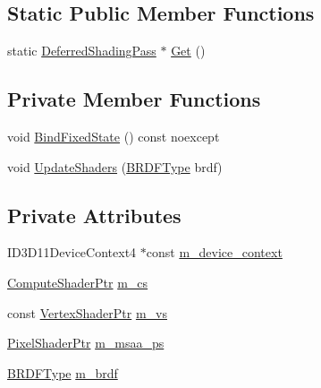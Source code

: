 \subsection*{Static Public Member Functions}
\begin{DoxyCompactItemize}
\item 
static \hyperlink{classmage_1_1_deferred_shading_pass}{Deferred\+Shading\+Pass} $\ast$ \hyperlink{classmage_1_1_deferred_shading_pass_a430dec186afda1f40c695b95fe3f7338}{Get} ()
\end{DoxyCompactItemize}
\subsection*{Private Member Functions}
\begin{DoxyCompactItemize}
\item 
void \hyperlink{classmage_1_1_deferred_shading_pass_a17b470e0d5ce381cd18d126d20649238}{Bind\+Fixed\+State} () const noexcept
\item 
void \hyperlink{classmage_1_1_deferred_shading_pass_a1be48c61dfb255a1641bae23d5277e4f}{Update\+Shaders} (\hyperlink{namespacemage_af1044f87544bc38427766a8c795d2f26}{B\+R\+D\+F\+Type} brdf)
\end{DoxyCompactItemize}
\subsection*{Private Attributes}
\begin{DoxyCompactItemize}
\item 
I\+D3\+D11\+Device\+Context4 $\ast$const \hyperlink{classmage_1_1_deferred_shading_pass_a05b1c649f39f267ce5a5cecdd02b8ffb}{m\+\_\+device\+\_\+context}
\item 
\hyperlink{namespacemage_a95ee75d4d07106395d80f751d364dc1b}{Compute\+Shader\+Ptr} \hyperlink{classmage_1_1_deferred_shading_pass_ae61ddf1399606393a2ff795a6d7e0307}{m\+\_\+cs}
\item 
const \hyperlink{namespacemage_a1f19b094f771e30bc0a6c1cebcc0dd58}{Vertex\+Shader\+Ptr} \hyperlink{classmage_1_1_deferred_shading_pass_aabaa6fd24ccef9c8db07898a182231e0}{m\+\_\+vs}
\item 
\hyperlink{namespacemage_acbec875bb5e5e085e32ed244a24d2b6f}{Pixel\+Shader\+Ptr} \hyperlink{classmage_1_1_deferred_shading_pass_a3a9e8ace034b974bd12afa551f6b1585}{m\+\_\+msaa\+\_\+ps}
\item 
\hyperlink{namespacemage_af1044f87544bc38427766a8c795d2f26}{B\+R\+D\+F\+Type} \hyperlink{classmage_1_1_deferred_shading_pass_a5a466f5c2ee71563f4f8ed6d042ee4b3}{m\+\_\+brdf}
\end{DoxyCompactItemize}


